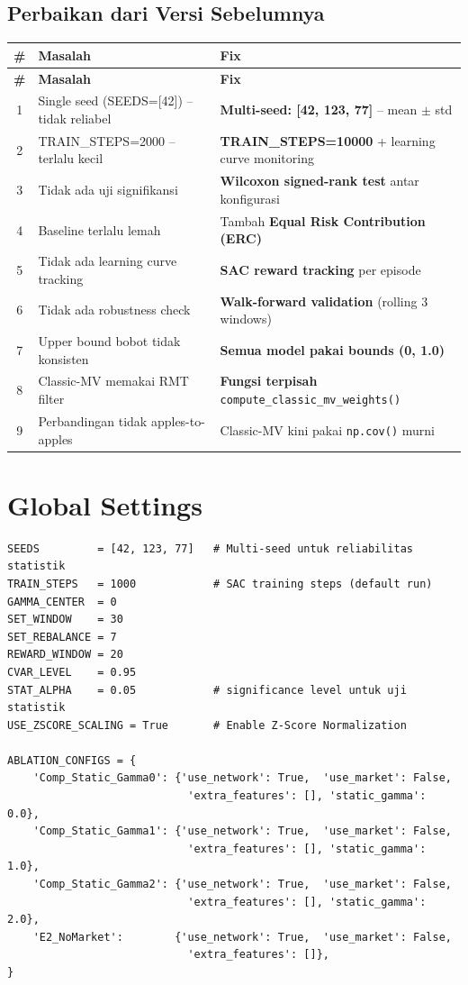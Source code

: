 \documentclass[12pt,a4paper]{article}
\begin{document}
\subsection{Perbaikan dari Versi Sebelumnya}

\begin{longtable}{@{}c p{5.5cm} p{7cm}@{}}
\toprule
\textbf{\#} & \textbf{Masalah} & \textbf{Fix} \\
\midrule
\endfirsthead
\toprule
\textbf{\#} & \textbf{Masalah} & \textbf{Fix} \\
\midrule
\endhead
1 & Single seed (SEEDS=[42]) -- tidak reliabel & \textbf{Multi-seed: [42, 123, 77]} -- mean $\pm$ std \\
2 & TRAIN\_STEPS=2000 -- terlalu kecil & \textbf{TRAIN\_STEPS=10000} + learning curve monitoring \\
3 & Tidak ada uji signifikansi & \textbf{Wilcoxon signed-rank test} antar konfigurasi \\
4 & Baseline terlalu lemah & Tambah \textbf{Equal Risk Contribution (ERC)} \\
5 & Tidak ada learning curve tracking & \textbf{SAC reward tracking} per episode \\
6 & Tidak ada robustness check & \textbf{Walk-forward validation} (rolling 3 windows) \\
7 & Upper bound bobot tidak konsisten & \textbf{Semua model pakai bounds (0, 1.0)} \\
8 & Classic-MV memakai RMT filter & \textbf{Fungsi terpisah} \texttt{compute\_classic\_mv\_weights()} \\
9 & Perbandingan tidak apples-to-apples & Classic-MV kini pakai \texttt{np.cov()} murni \\
\bottomrule
\end{longtable}

\section{Global Settings}

\begin{lstlisting}[caption={Global Settings -- Thesis-Ready Version}]
SEEDS         = [42, 123, 77]   # Multi-seed untuk reliabilitas statistik
TRAIN_STEPS   = 1000            # SAC training steps (default run)
GAMMA_CENTER  = 0
SET_WINDOW    = 30
SET_REBALANCE = 7
REWARD_WINDOW = 20
CVAR_LEVEL    = 0.95
STAT_ALPHA    = 0.05            # significance level untuk uji statistik
USE_ZSCORE_SCALING = True       # Enable Z-Score Normalization

ABLATION_CONFIGS = {
    'Comp_Static_Gamma0': {'use_network': True,  'use_market': False,
                            'extra_features': [], 'static_gamma': 0.0},
    'Comp_Static_Gamma1': {'use_network': True,  'use_market': False,
                            'extra_features': [], 'static_gamma': 1.0},
    'Comp_Static_Gamma2': {'use_network': True,  'use_market': False,
                            'extra_features': [], 'static_gamma': 2.0},
    'E2_NoMarket':        {'use_network': True,  'use_market': False,
                            'extra_features': []},
}
\end{lstlisting}
\end{document}
